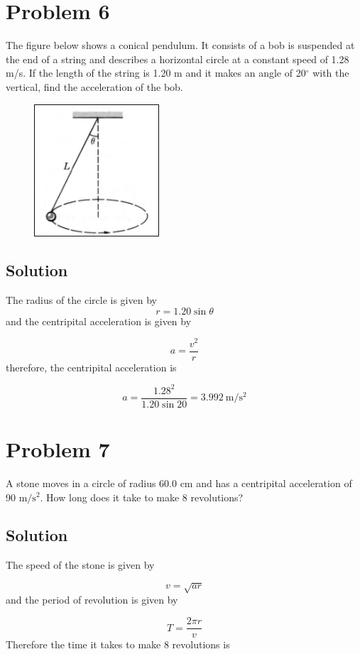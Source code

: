 \documentclass{article}
\begin{document}
\section*{Problem 6}
The figure below shows a conical pendulum. It consists of a bob is suspended at the end of a
string and describes a horizontal circle at a constant speed of 1.28 m/s. If the length of the
string is 1.20 m and it makes an angle of 20$^\circ$ with the vertical, find the acceleration of the bob.

\begin{figure}[ht]
    \centering
    \includegraphics[scale=.5]{drawing-1.png}
\end{figure}

\subsection*{Solution}
The radius of the circle is given by
\[
	r = 1.20 \sin \theta
\]
and the centripital acceleration is given by

\[
	a = \frac{v^2}{r}
\]
therefore, the centripital acceleration is

\[
	a = \frac{1.28^2}{1.20 \sin 20} = \boxed{3.992\ \text{m}/\text{s}^2}
\]

\section*{Problem 7}
A stone moves in a circle of radius 60.0 cm and has a centripital acceleration of 90 $\text{m}/\text{s}^2$. How
long does it take to make 8 revolutions?

\subsection*{Solution}
The speed of the stone is given by

\[
	v = \sqrt{ar}
\]
and the period of revolution is given by

\[
	T = \frac{2 \pi r}{v}
\]
Therefore the time it takes to make 8 revolutions is
\end{document}
